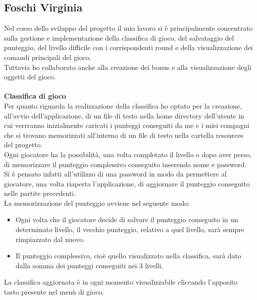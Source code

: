 \documentclass[a4paper,12pt]{report}
\begin{document}
\subsection{Foschi Virginia}
Nel corso dello sviluppo del progetto il mio lavoro si è principalmente concentrato sulla gestione e implementazione della classifica di gioco, del salvataggio del punteggio, del livello difficile con i corrispondenti round e della visualizzazione dei comandi principali del gioco.\\
Tuttavia ho collaborato anche alla creazione dei bonus e alla visualizzazione degli oggetti del gioco.\\\\
\textbf{Classifica di gioco}\\
Per quanto riguarda la realizzazione della classifica ho optato per la creazione, all'avvio dell'applicazione, di un file di testo nella home directory dell'utente in cui verrranno inizialmente caricati i punteggi conseguiti da me e i miei compagni che si trovano memorizzati all'interno di un file di testo nella cartella resources del progetto.
\\Ogni giocatore ha la possibilità, una volta completato il livello o dopo aver perso, di memorizzare il punteggio complessivo conseguito inserendo nome e password. Si è pensato infatti all'utilizzo di una password in modo da permettere al giocatore, una volta riaperta l'applicazione, di aggiornare il punteggio conseguito nelle partite precedenti.
\\La memorizzazione del punteggio avviene nel seguente modo:
\begin{itemize}
    \item Ogni volta che il giocatore decide di salvare il punteggio conseguito in un determinato livello, il vecchio punteggio, relativo a quel livello, sarà sempre rimpiazzato dal nuovo.
    \item Il punteggio complessivo, cioè quello visualizzato nella classifica, sarà dato dalla somma dei punteggi conseguiti nei 3 livelli.
\end{itemize}
La classifica aggiornata è in ogni momento visualizzabile cliccando l'apposito tasto presente nel menù di gioco.\\\\
\end{document}
